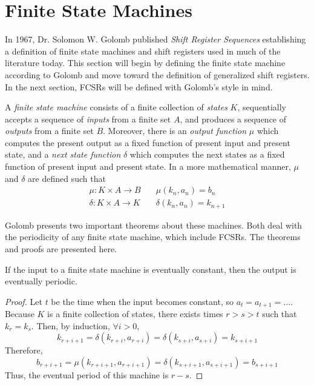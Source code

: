 \section{Finite State Machines}
\par In 1967, Dr. Solomon W. Golomb published {\em Shift Register Sequences}
establishing a definition of finite state machines and shift registers used in
much of the literature today. This section will begin by defining the finite state
machine according to Golomb and move toward the definition of generalized shift
registers. In the next section, FCSRs will be defined with Golomb's style in mind.

\begin{definition}\label{finite-state-machine}
  A {\em finite state machine} consists of a finite collection of {\em states}
  $K$, sequentially accepts a sequence of {\em inputs} from a finite set
  $A$, and produces a sequence of {\em outputs} from a finite set
  $B$. Moreover, there is an {\em output function} $\mu$ which computes
  the present output as a fixed function of present input and present state, and a
  {\em next state function} $\delta$ which computes the next states as a fixed
  function of present input and present state. In a more mathematical manner,
  $\mu$ and $\delta$ are defined such that
  \begin{eqnarray}
    \mu:K \times A \rightarrow B \quad &\mu(k_n,a_n)=b_n \\
    \delta:K \times A \rightarrow K \quad &\delta(k_n,a_n)=k_{n+1}
  \end{eqnarray}
\end{definition}


\par Golomb presents two important theorems about these machines. Both deal with
the periodicity of any finite state machine, which include FCSRs. The theorems
and proofs are presented here.

\begin{theorem}\label{thm:golomb-1}
  If the input to a finite state machine is eventually constant, then the output
  is eventually periodic.
\end{theorem}
\begin{proof}
  Let $t$ be the time when the input becomes constant, so $a_t=a_{t+1}=\dots$.
  Because $K$ is a finite collection of states, there exists times $r>s>t$ such
  that $k_r=k_s$. Then, by induction, $\forall i>0$,
  \[
  k_{r+i+1}=\delta(k_{r+i},a_{r+i})=\delta(k_{s+i},a_{s+i})=k_{s+i+1}
  \]
  Therefore,
  \[
  b_{r+i+1}=\mu(k_{r+i+1},a_{r+i+1})=\delta(k_{s+i+1},a_{s+i+1})=b_{s+i+1}
  \]
  Thus, the eventual period of this machine is $r-s$.
\end{proof}

